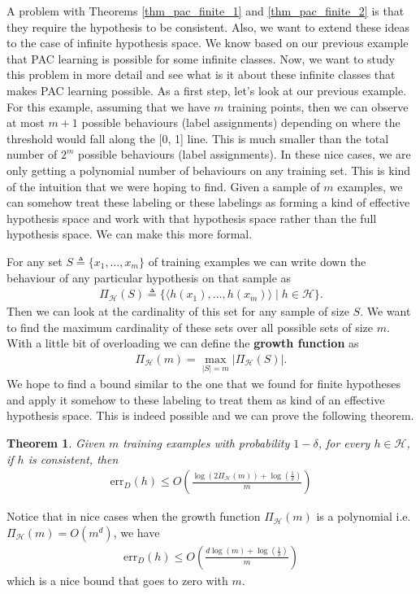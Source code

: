 \documentclass[10pt ]{article}
\newtheorem{thm}{Theorem}
\begin{document}
A problem with Theorems \ref{thm_pac_finite_1} and \ref{thm_pac_finite_2} is that they require the hypothesis to be consistent. Also, we want to extend these ideas to the case of infinite hypothesis space. We know based on our previous example that PAC learning is possible for some infinite classes. Now, we want to study this problem in more detail and see what is it about these infinite classes that makes PAC learning possible.  As a first step, let's look at our previous example. For this example, assuming that we have $m$ training points, then we can observe at most $m+1$ possible behaviours (label assignments) depending on where the threshold would fall along the [0, 1] line. This is much smaller than the total number of $2^m$ possible behaviours (label assignments). In these nice cases, we are only getting a polynomial number of behaviours on any training set. This is kind of the intuition that we were hoping to find. Given a sample of $m$ examples, we can somehow treat these labeling or these labelings as forming a kind of effective hypothesis space and work with that hypothesis space rather than the full hypothesis space.  We can make this more formal. 

For any set $S \triangleq \{x_1, \dots, x_m\}$ of training examples we can write down the behaviour of any particular hypothesis on that sample as 
\begin{align}
\Pi_{\mathcal{H}}(S) \triangleq \{\langle h(x_1), \dots, h(x_m) \rangle \mid h \in \mathcal{H}\}.
\end{align}
Then we can look at the cardinality of this set for any sample of size $S$. We want to find the maximum cardinality of these sets over all possible sets of size $m$. With a little bit of overloading we can define the \textbf{growth function} as 
\begin{align}
\Pi_{\mathcal{H}}(m) = \max_{|S|=m} |\Pi_{\mathcal{H}}(S)|.
\end{align}
We hope to find a bound similar to the one that we found for finite hypotheses and apply it somehow to these labeling to treat them as kind of an effective hypothesis space. This is indeed possible and we can prove the following theorem.
\begin{thm}
{\em
Given $m$ training examples with probability $1-\delta$, for every $h \in \mathcal{H}$, if $h$ is consistent, then 
\begin{align}
\mathrm{err}_D(h) \le  O \left( \frac{\log\left(2\Pi_{\mathcal{H}}(m)\right) + \log\left(\frac{1}{\delta}\right)}{m}\right)
\end{align}
}\label{thm_infinite_H}
\end{thm}
Notice that in nice cases when the growth function $\Pi_{\mathcal{H}}(m)$ is a polynomial i.e. $\Pi_{\mathcal{H}}(m) = O(m^d)$, we have 
\begin{align}
\mathrm{err}_D(h) \le  O \left( \frac{d\log\left(m\right) + \log\left(\frac{1}{\delta}\right)}{m}\right)
\label{eq_vc_dim_err_bnd}
\end{align}
which is a nice bound that goes to zero with $m$.
\end{document}
